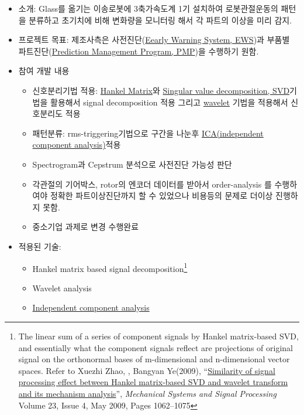 \documentclass[10pt,a4paper,ragged2e]{altacv}
\begin{document}
\begin{fullwidth}
\begin{itemize}
\item 소개: Glass를 옮기는 이송로봇에 3축가속도계 1기 설치하여 로봇관절운동의 패턴을 분류하고 초기치에 비해 변화량을 모니터링 해서 각 파트의 이상을 미리 감지. 
\item 프로젝트 목표: 제조사측은 사전진단(\href{https://en.wikipedia.org/wiki/Early_warning_system}{Eearly Warning System, EWS})과 부품별 파트진단(\href{https://en.wikipedia.org/wiki/Predictive_maintenance}{Prediction Management Program, PMP})을 수행하기 원함.
\item 참여 개발 내용
  \begin{itemize}
    \item 신호분리기법 적용: \href{https://en.wikipedia.org/wiki/Hankel_matrix}{Hankel Matrix}와 \href{https://en.wikipedia.org/wiki/Singular_value_decomposition}{Singular value decomposition, SVD}기법을 활용해서 signal decomposition 적용 그리고 \href{https://en.wikipedia.org/wiki/Wavelet}{wavelet} 기법을 적용해서 신호분리도 적용 \item 패턴분류: rms-triggering기법으로 구간을 나눈후 \href{https://en.wikipedia.org/wiki/Independent_component_analysis}{ICA(independent component analysis)}적용
    \item Spectrogram과 Cepstrum 분석으로 사전진단 가능성 판단
    \item 각관절의 기어박스, rotor의 엔코더 데이터를 받아서 order-analysis 를 수행하여야 정확한 파트이상진단까지 할 수 있었으나 비용등의 문제로 더이상 진행하지 못함. 
    \item 중소기업 과제로 변경 수행완료
  \end{itemize}
\item 적용된 기술:
  \begin{itemize}
    \item Hankel matrix based signal decomposition\footnote{The linear sum of a series of component signals by Hankel matrix-based SVD, and essentially what the component signals reflect are projections of original signal on the orthonormal bases of m-dimensional and n-dimensional vector spaces. Refer to Xuezhi Zhao, , Bangyan Ye(2009),  ``\href{http://www.sciencedirect.com/science/article/pii/S0888327008002604}{Similarity of signal processing effect between Hankel matrix-based SVD and wavelet transform and its mechanism analysis}'', \emph{Mechanical Systems and Signal Processing} Volume 23, Issue 4, May 2009, Pages 1062--1075}
    \item Wavelet analysis
    \item \href{https://en.wikipedia.org/wiki/Independent_component_analysis}{Independent component analysis}

\end{itemize}
\end{itemize}
\end{fullwidth}
\end{document}
